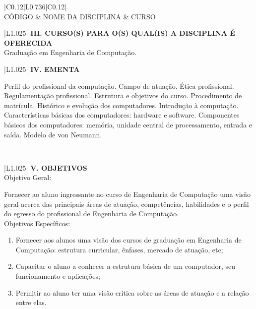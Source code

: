 \documentclass[12pt]{article}
\newcommand{\requisitoA}{}
\newcommand{\requisitoB}{}
\newcommand{\requisitoC}{}
\newcommand{\cursoA}{Graduação em Engenharia de Computação. \\ \hline}
\newcommand{\ementa}{

Perfil do profissional da computação. Campo de atuação. Ética profissional. Regulamentação profissional. Estrutura e objetivos do curso. Procedimento de matrícula. Histórico e evolução dos computadores. Introdução à computação. Características básicas dos computadores: hardware e software. Componentes básicos dos computadores: memória, unidade central de processamento, entrada e saída. Modelo de von Neumann.

 \\ \hline
}
\begin{document}
\begin{longtable}{|C{0.12\textwidth}|L{0.736\textwidth}|C{0.12\textwidth}|} \hline
%
 \\ \hline
%
CÓDIGO & NOME DA DISCIPLINA & CURSO \\ \hline	
%
\requisitoA
\requisitoB
\requisitoC
\end{longtable}


\begin{longtable}{|L{1.025\textwidth}|} \hline
%
{\bf III. CURSO(S) PARA O(S) QUAL(IS) A DISCIPLINA É OFERECIDA } \\ \hline
%
\cursoA 

\end{longtable}

\begin{longtable}{|L{1.025\textwidth}|} \hline
%
{\bf IV. EMENTA } \\ \hline
%
\ementa
\end{longtable}

\newpage



\begin{longtable}{|L{1.025\textwidth}|} \hline
%
{\bf V. OBJETIVOS } \\ \hline
%
Objetivo Geral:

Fornecer ao aluno ingressante no curso de Engenharia de Computação uma visão geral acerca das principais áreas de atuação, competências, habilidades e o perfil do egresso do profissional de Engenharia de Computação. \\

Objetivos Específicos:
\begin{enumerate}

\item Fornecer aos alunos uma visão dos cursos de graduação em Engenharia de Computação: estrutura curricular, ênfases, mercado de atuação, etc;
\item Capacitar o aluno a conhecer a estrutura básica de um computador, seu funcionamento e aplicações; 
\item Permitir ao aluno ter uma visão crítica sobre as áreas de atuação e a relação entre elas.

\end{enumerate}

\\ \hline
\end{longtable}
\end{document}
